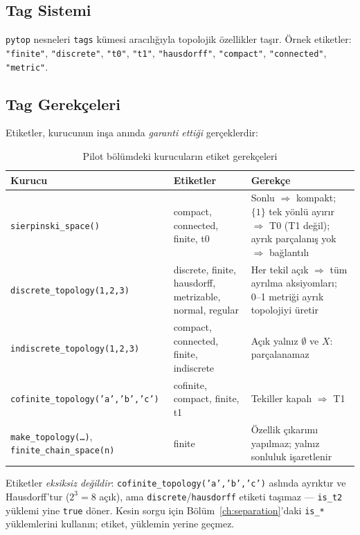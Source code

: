 \subsection{Tag Sistemi}

\texttt{pytop} nesneleri \texttt{tags} kümesi aracılığıyla topolojik özellikler taşır.
Örnek etiketler: \texttt{"finite"}, \texttt{"discrete"}, \texttt{"t0"}, \texttt{"t1"},
\texttt{"hausdorff"}, \texttt{"compact"}, \texttt{"connected"}, \texttt{"metric"}.

\subsection{Tag Gerekçeleri}

Etiketler, kurucunun inşa anında \emph{garanti ettiği} gerçeklerdir:

\begin{table}[ht]
\centering
\begin{tabular}{lp{4.2cm}p{5.6cm}}
\toprule
\textbf{Kurucu} & \textbf{Etiketler} & \textbf{Gerekçe} \\
\midrule
\texttt{sierpinski\_space()} & compact, connected, finite, t0 &
  Sonlu $\Rightarrow$ kompakt; $\{1\}$ tek yönlü ayırır $\Rightarrow$ T0
  (T1 değil); ayrık parçalanış yok $\Rightarrow$ bağlantılı \\
\texttt{discrete\_topology(1,2,3)} & discrete, finite, hausdorff,
  metrizable, normal, regular &
  Her tekil açık $\Rightarrow$ tüm ayrılma aksiyomları; 0--1 metriği
  ayrık topolojiyi üretir \\
\texttt{indiscrete\_topology(1,2,3)} & compact, connected, finite,
  indiscrete & Açık yalnız $\emptyset$ ve $X$: parçalanamaz \\
\texttt{cofinite\_topology('a','b','c')} & cofinite, compact, finite,
  t1 & Tekiller kapalı $\Rightarrow$ T1 \\
\texttt{make\_topology(\ldots)},
  \texttt{finite\_chain\_space(n)} & finite &
  Özellik çıkarımı yapılmaz; yalnız sonluluk işaretlenir \\
\bottomrule
\end{tabular}
\caption{Pilot bölümdeki kurucuların etiket gerekçeleri}
\end{table}

\noindent Etiketler \emph{eksiksiz değildir}:
\texttt{cofinite\_topology('a','b','c')} aslında ayrıktır ve
Hausdorff'tur ($2^3=8$ açık), ama \texttt{discrete}/\texttt{hausdorff}
etiketi taşımaz --- \texttt{is\_t2} yüklemi yine \texttt{true} döner.
Kesin sorgu için Bölüm~\ref{ch:separation}'daki \texttt{is\_*}
yüklemlerini kullanın; etiket, yüklemin yerine geçmez.

